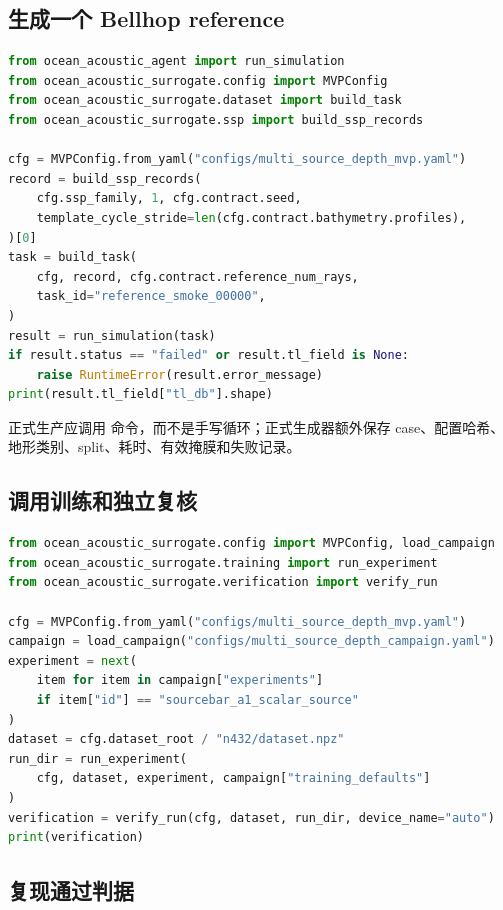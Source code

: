 \documentclass[UTF8,11pt]{ctexart}
\begin{document}
\subsection{生成一个 Bellhop reference}

\begin{lstlisting}[style=repro,language=Python]
from ocean_acoustic_agent import run_simulation
from ocean_acoustic_surrogate.config import MVPConfig
from ocean_acoustic_surrogate.dataset import build_task
from ocean_acoustic_surrogate.ssp import build_ssp_records

cfg = MVPConfig.from_yaml("configs/multi_source_depth_mvp.yaml")
record = build_ssp_records(
    cfg.ssp_family, 1, cfg.contract.seed,
    template_cycle_stride=len(cfg.contract.bathymetry.profiles),
)[0]
task = build_task(
    cfg, record, cfg.contract.reference_num_rays,
    task_id="reference_smoke_00000",
)
result = run_simulation(task)
if result.status == "failed" or result.tl_field is None:
    raise RuntimeError(result.error_message)
print(result.tl_field["tl_db"].shape)
\end{lstlisting}

正式生产应调用  命令，而不是手写循环；正式生成器额外保存 case、配置哈希、
地形类别、split、耗时、有效掩膜和失败记录。

\subsection{调用训练和独立复核}

\begin{lstlisting}[style=repro,language=Python]
from ocean_acoustic_surrogate.config import MVPConfig, load_campaign
from ocean_acoustic_surrogate.training import run_experiment
from ocean_acoustic_surrogate.verification import verify_run

cfg = MVPConfig.from_yaml("configs/multi_source_depth_mvp.yaml")
campaign = load_campaign("configs/multi_source_depth_campaign.yaml")
experiment = next(
    item for item in campaign["experiments"]
    if item["id"] == "sourcebar_a1_scalar_source"
)
dataset = cfg.dataset_root / "n432/dataset.npz"
run_dir = run_experiment(
    cfg, dataset, experiment, campaign["training_defaults"]
)
verification = verify_run(cfg, dataset, run_dir, device_name="auto")
print(verification)
\end{lstlisting}

\subsection{复现通过判据}
\end{document}
